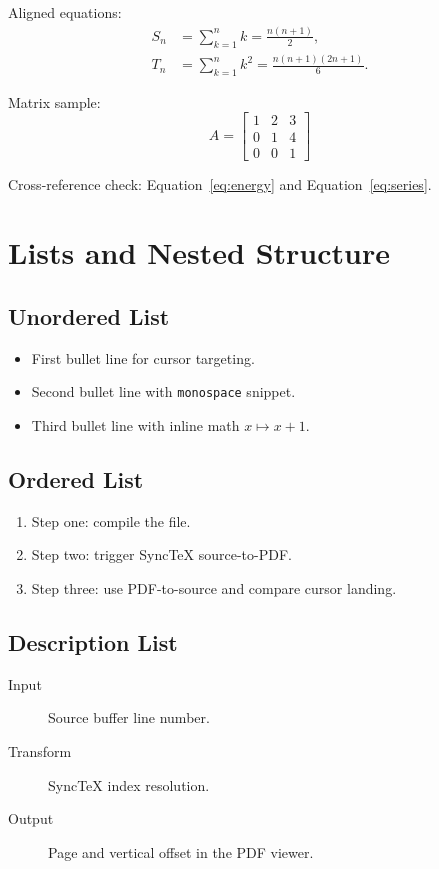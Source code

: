 \documentclass{article}
\begin{document}
Aligned equations:
\begin{align}
\label{eq:series}
S_n &= \sum_{k=1}^{n} k = \frac{n(n+1)}{2}, \\
T_n &= \sum_{k=1}^{n} k^2 = \frac{n(n+1)(2n+1)}{6}.
\end{align}

Matrix sample:
\[
A =
\begin{bmatrix}
1 & 2 & 3 \\
0 & 1 & 4 \\
0 & 0 & 1
\end{bmatrix}
\]

Cross-reference check: Equation~\ref{eq:energy} and Equation~\ref{eq:series}.

\newpage
\section{Lists and Nested Structure}
\label{sec:lists}
\subsection{Unordered List}
\begin{itemize}
  \item First bullet line for cursor targeting.
  \item Second bullet line with \texttt{monospace} snippet.
  \item Third bullet line with inline math $x \mapsto x+1$.
\end{itemize}

\subsection{Ordered List}
\begin{enumerate}
  \item Step one: compile the file.
  \item Step two: trigger SyncTeX source-to-PDF.
  \item Step three: use PDF-to-source and compare cursor landing.
\end{enumerate}

\subsection{Description List}
\begin{description}
  \item[Input] Source buffer line number.
  \item[Transform] SyncTeX index resolution.
  \item[Output] Page and vertical offset in the PDF viewer.
\end{description}
\end{document}
